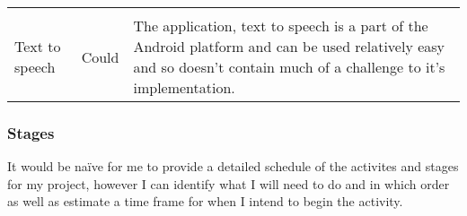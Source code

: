 \begin{longtable}[]{@{}lll@{}}
\begin{minipage}[t]{0.60\columnwidth}
\end{minipage}\tabularnewline
\begin{minipage}[t]{0.22\columnwidth}\raggedright\strut
Text to speech\strut
\end{minipage} & \begin{minipage}[t]{0.10\columnwidth}\raggedright\strut
Could\strut
\end{minipage} & \begin{minipage}[t]{0.60\columnwidth}\raggedright\strut
The application, text to speech is a part of the Android platform and
can be used relatively easy and so doesn't contain much of a challenge
to it's implementation.\strut
\end{minipage}\tabularnewline
\bottomrule
\end{longtable}

\subsubsection{Stages}\label{stages}

It would be naïve for me to provide a detailed schedule of the activites
and stages for my project, however I can identify what I will need to do
and in which order as well as estimate a time frame for when I intend to
begin the activity.

